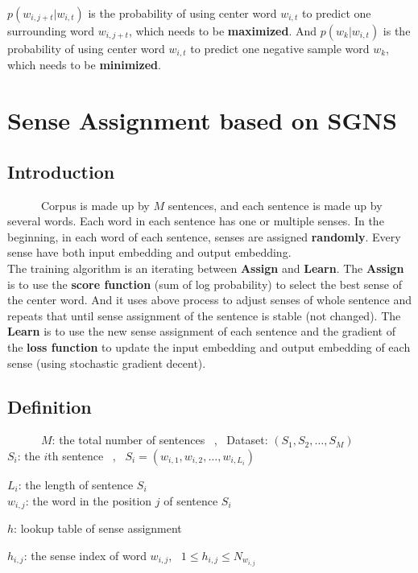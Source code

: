 \documentclass[12pt,a4paper,twoside]{book}
\begin{document}
 $p(w_{i,j+t}|w_{i,t})$ is the probability of using center word $w_{i,t}$ to predict one surrounding word $w_{i,j+t}$, which needs to be \textbf{maximized}.
And $p(w_k|w_{i,t})$ is the probability of using center word $w_{i,t}$ to predict one negative sample word $w_k$, which needs to be \textbf{minimized}.  \\

\section{Sense Assignment based on SGNS}
\subsection{Introduction}
\ \ \ \ \ \ Corpus is made up by $M$ sentences, and each sentence is made up by several words. Each word in each sentence has one or multiple senses. In the beginning, in each word of each sentence, senses are assigned \textbf{randomly}. Every sense have both input embedding and output embedding.\\

The training algorithm is an iterating between \textbf{Assign} and \textbf{Learn}. The \textbf{Assign} is to use the \textbf{score function} (sum of log probability) to select the best sense of the center word. And it uses above process to adjust senses of whole sentence and repeats that until sense assignment of the sentence is stable (not changed). The \textbf{Learn} is to use the new sense assignment of each sentence and the gradient of the \textbf{loss function} to update the input embedding and output embedding of each sense (using stochastic gradient decent). 
\subsection{Definition}

\ \ \ \ \ \ $M$: the total number of sentences \ , \ Dataset: $(S_1,S_2,\ldots,S_M)$\\

$S_i$: the $i$th sentence \ , \ $S_i = (w_{i,1},w_{i,2},\ldots,w_{i,L_i})$

$L_i$: the length of sentence $S_i$\\

$w_{i,j}$: the word in the position $j$ of sentence $S_i$

$h$: lookup table of sense assignment

$h_{i,j}$: the sense index of word $w_{i,j}$, \ $1\leq h_{i,j}\leq N_{w_{i,j}}$
\end{document}
